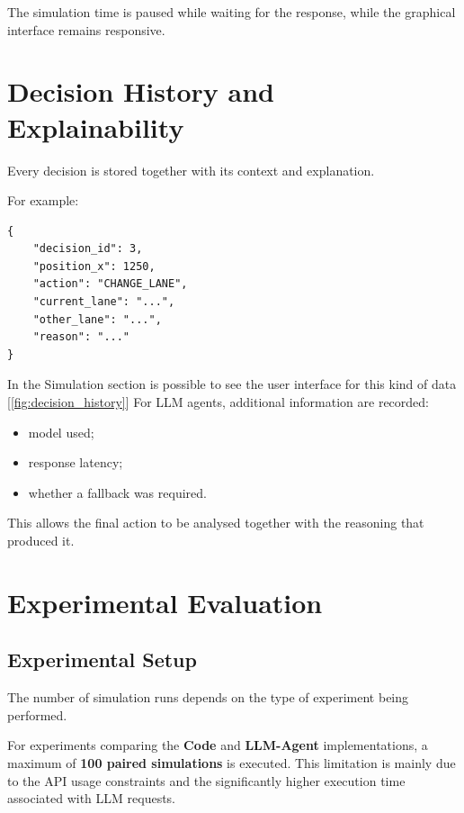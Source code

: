 \documentclass[10pt,a4paper]{article}
\begin{document}
The simulation time is paused while waiting for the response, while the
graphical interface remains responsive.


\section{Decision History and Explainability}

Every decision is stored together with its context and explanation.

For example:

\begin{verbatim}
{
    "decision_id": 3,
    "position_x": 1250,
    "action": "CHANGE_LANE",
    "current_lane": "...",
    "other_lane": "...",
    "reason": "..."
}
\end{verbatim}

In the Simulation section is possible to see the user interface for this kind of data [\ref{fig:decision_history}]
For LLM agents, additional information are recorded:

\begin{itemize}
    \item model used;
    \item response latency;
    \item whether a fallback was required.
\end{itemize}

This allows the final action to be analysed together with the reasoning
that produced it.


\newpage
\section{Experimental Evaluation}
\label{sec:experimental-evaluation}

\subsection{Experimental Setup}

The number of simulation runs depends on the type of experiment being performed.

For experiments comparing the \textbf{Code} and \textbf{LLM-Agent} implementations, a maximum of \textbf{100 paired simulations} is executed. This limitation is mainly due to the API usage constraints and the significantly higher execution time associated with LLM requests.
\end{document}
